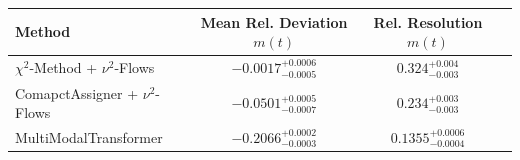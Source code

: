     \begin{tabular}{lccc}
        \toprule
        Method & Mean Rel. Deviation $m(t)$ & Rel. Resolution $m(t)$ \\
        \midrule
        $\chi^2$-Method + $\nu^2$-Flows & $-0.0017^{+0.0006}_{-0.0005}$ & $0.324^{+0.004}_{-0.003}$ \\
        ComapctAssigner + $\nu^2$-Flows & $-0.0501^{+0.0005}_{-0.0007}$ & $0.234^{+0.003}_{-0.003}$ \\
        MultiModalTransformer & $-0.2066^{+0.0002}_{-0.0003}$ & $0.1355^{+0.0006}_{-0.0004}$ \\
        \bottomrule
    \end{tabular}